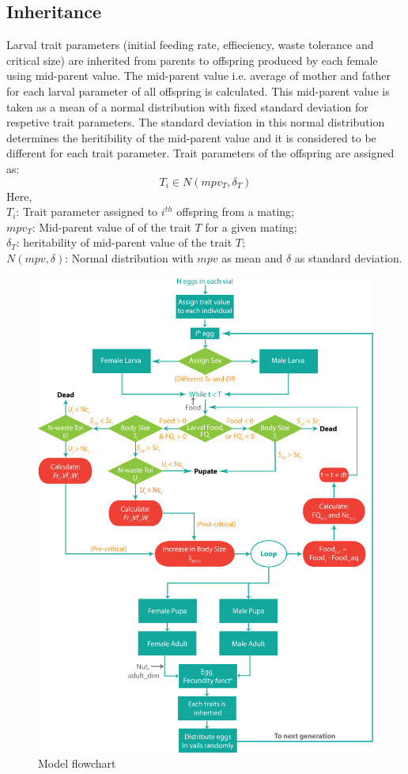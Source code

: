 \subsection{Inheritance}
Larval trait parameters (initial feeding rate, effieciency, waste tolerance and critical size) are inherited from parents to offspring produced by each female using mid-parent value. The mid-parent value i.e. average of mother and father for each larval parameter of all offspring is calculated. This mid-parent value is taken as a mean of a normal distribution with fixed standard deviation for respetive trait parameters. The standard deviation in this normal distribution determines the heritibility of the mid-parent value and it is considered to be different for each trait parameter. Trait parameters of the offspring are assigned as:
\[T_{i} \in N(mpv_{T}, \delta_{T})\]
Here, \\
$T_{i}$: Trait parameter assigned to $i^{th}$ offspring from a mating; \\
$mpv_{T}$: Mid-parent value of of the trait $T$ for a given mating; \\
$\delta_{T}$: heritability of mid-parent value of the trait $T$; \\
$N(mpv, \delta)$: Normal distribution with $mpv$ as mean and $\delta$ as standard deviation.
\begin{figure}[p]
  \centering
  \includegraphics[trim= 0 0 0 0, clip, width= \textwidth]{C4/Figs/model}
  \caption{Model flowchart}
  \label{model}
\end{figure}

